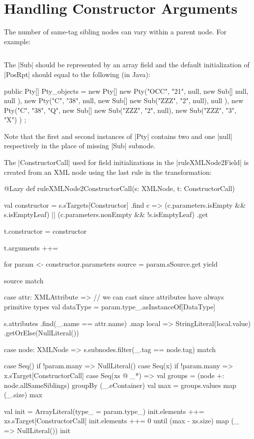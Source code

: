 \section{Handling Constructor Arguments}
\label{sec:AppendixConstructorArguments}

The number of same-tag sibling nodes can vary within a parent node.
For example:

\inputminted[fontsize=\fontsize{8}{8},linenos,numbersep=5pt,frame=lines,framesep=2mm]{xml}{listings/variable-siblings.xml}

The \Scala|Sub| should be represented by an array field and the default initialization of \Scala|PosRpt| should equal to the following (in Java):
%
\begin{javacode}
public Pty[] Pty_objects = new Pty[] { 
  new Pty("OCC", "21", null, new Sub[] { null, null }),
  new Pty("C", "38", null, new Sub[] { new Sub("ZZZ", "2", null), null }),
  new Pty("C", "38", "Q", new Sub[] { new Sub("ZZZ", "2", null), new Sub("ZZZ", "3", "X") }) 
};
\end{javacode}
%
Note that the first and second instances of \Scala|Pty| contains two and one \Scala|null| respectively in the place of missing \Scala|Sub| subnode.

The \Scala|ConstructorCall| used for field initializations in the \Scala|ruleXMLNode2Field| is created from an XML node using the last rule in the transformation:
%
\begin{scalacode}
@Lazy
def ruleXMLNode2ConstructorCall(s: XMLNode, t: ConstructorCall) {
  val constructor = s.sTargets[Constructor]
    .find { c =>
      (c.parameters.isEmpty && s.isEmptyLeaf) ||
      (c.parameters.nonEmpty && !s.isEmptyLeaf)
    }
    .get

  t.constructor = constructor

  t.arguments ++= {
    for {
      param <- constructor.parameters
      source = param.sSource.get
    } yield {
      source match {
        case attr: XMLAttribute =>
          // we can cast since attributes have always primitive types
          val dataType = param.type_.asInstanceOf[DataType]

          s.attributes
            .find(_.name == attr.name)
            .map { local => StringLiteral(local.value) }
            .getOrElse(NullLiteral())

        case node: XMLNode =>
          s.subnodes.filter(_.tag == node.tag) match {

            case Seq() if !param.many =>
              NullLiteral()
            case Seq(x) if !param.many =>
              x.sTarget[ConstructorCall]
            case Seq(xs @ _*) =>
              val groups = (node +: node.allSameSiblings) groupBy (_.eContainer)
              val max = groups.values map (_.size) max
              
              val init = ArrayLiteral(type_ = param.type_)
              init.elements ++= xs.sTarget[ConstructorCall]
              init.elements ++= 0 until (max - xs.size) map (_ => NullLiteral())
              init
          }
      }
    }
  }
}
\end{scalacode}  


